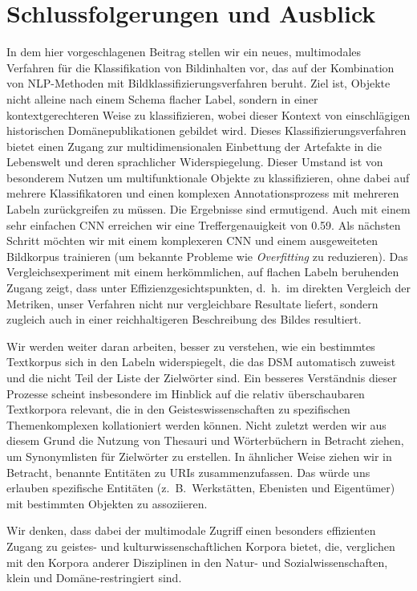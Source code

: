 \section{Schlussfolgerungen und Ausblick}
In dem hier vorgeschlagenen Beitrag stellen wir ein neues, multimodales Verfahren für die Klassifikation von Bildinhalten vor, das auf der Kombination von NLP-Methoden mit Bildklassifizierungsverfahren beruht. Ziel ist, Objekte nicht alleine nach einem Schema flacher Label, sondern in einer kontextgerechteren Weise zu klassifizieren, wobei dieser Kontext von einschlägigen historischen Domänepublikationen gebildet wird. Dieses Klassifizierungsverfahren bietet einen Zugang zur multidimensionalen Einbettung der Artefakte in die Lebenswelt und deren sprachlicher Widerspiegelung. Dieser Umstand ist von besonderem Nutzen um multifunktionale Objekte zu klassifizieren, ohne dabei auf mehrere Klassifikatoren und einen komplexen Annotationsprozess mit mehreren Labeln zurückgreifen zu müssen. Die Ergebnisse sind ermutigend. Auch mit einem sehr einfachen CNN erreichen wir eine Treffergenauigkeit von \num{0.59}. Als nächsten Schritt möchten wir mit einem komplexeren CNN und einem ausgeweiteten Bildkorpus trainieren (um bekannte Probleme wie \emph{Overfitting} zu reduzieren). Das Vergleichsexperiment mit einem herkömmlichen, auf flachen Labeln beruhenden Zugang zeigt, dass unter Effizienzgesichtspunkten, d.~h.~im direkten Vergleich der Metriken, unser Verfahren nicht nur vergleichbare Resultate liefert, sondern zugleich auch in einer reichhaltigeren Beschreibung des Bildes resultiert.

Wir werden weiter daran arbeiten, besser zu verstehen, wie ein bestimmtes Textkorpus sich in den Labeln widerspiegelt, die das DSM automatisch zuweist und die nicht Teil der Liste der Zielwörter sind. Ein besseres Verständnis dieser Prozesse scheint insbesondere im Hinblick auf die relativ überschaubaren Textkorpora relevant, die in den Geisteswissenschaften zu spezifischen Themenkomplexen kollationiert werden können. Nicht zuletzt werden wir aus diesem Grund die Nutzung von Thesauri und Wörterbüchern in Betracht ziehen, um Synonymlisten für Zielwörter zu erstellen. In ähnlicher Weise ziehen wir in Betracht, benannte Entitäten zu URIs zusammenzufassen. Das würde uns erlauben spezifische Entitäten (z.~B.~Werkstätten, Ebenisten und Eigentümer) mit bestimmten Objekten zu assoziieren.

Wir denken, dass dabei der multimodale Zugriff einen besonders effizienten Zugang zu geistes- und kulturwissenschaftlichen Korpora bietet, die, verglichen mit den Korpora anderer Disziplinen in den Natur- und Sozialwissenschaften, klein und Domäne-restringiert sind.
